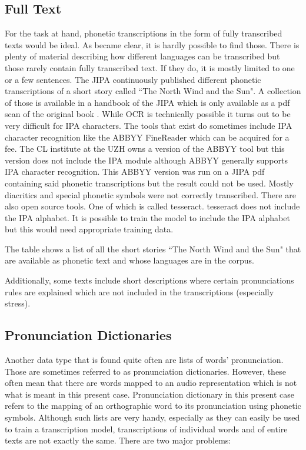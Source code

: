 \subsection{Full Text}
For the task at hand, phonetic transcriptions in the form of fully transcribed texts would be ideal. As became clear, it is hardly possible to find those. There is plenty of material describing how different languages can be transcribed but those rarely contain fully transcribed text. If they do, it is mostly limited to one or a few sentences. The JIPA continuously published different phonetic transcriptions of a short story called ``The North Wind and the Sun". A collection of those is available in a handbook of the JIPA which is only available as a pdf scan of the original book \citep{JIPA2010}. While OCR is technically possible it turns out to be very difficult for IPA characters. The tools that exist do sometimes include IPA character recognition like the ABBYY FineReader which can be acquired for a fee. The CL institute at the UZH owns a version of the ABBYY tool but this version does not include the IPA module although ABBYY generally supports IPA character recognition. This ABBYY version was run on a JIPA pdf containing said phonetic transcriptions but the result could not be used. Mostly diacritics and special phonetic symbols were not correctly transcribed. There are also open source tools. One of which is called tesseract. tesseract does not include the IPA alphabet. It is possible to train the model to include the IPA alphabet but this would need appropriate training data. 



\begin{table}[h!]
\begin{center}
\caption[The North Wind and the Sun]{The table shows a list of all the short stories ``The North Wind and the Sun" that are available as phonetic text and whose languages are in the corpus.}
\label{north-wind-stories}
\end{center}
\end{table}



Additionally, some texts include short descriptions where certain pronunciations rules are explained which are not included in the transcriptions (especially stress). 

\subsection{Pronunciation Dictionaries}
Another data type that is found quite often are lists of words' pronunciation. Those are sometimes referred to as pronunciation dictionaries. However, these often mean that there are words mapped to an audio representation which is not what is meant in this present case. Pronunciation dictionary in this present case refers to the mapping of an orthographic word to its pronunciation using phonetic symbols. Although such lists are very handy, especially as they can easily be used to train a transcription model, transcriptions of individual words and of entire texts are not exactly the same. There are two major problems:

